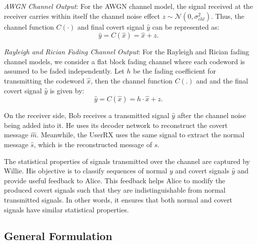 \textit{AWGN Channel Output}: For the AWGN channel model, the signal received at the receiver carries within itself the channel noise effect \(z \sim \mathcal{N}(0, \sigma_{chl}^2)\). Thus, the channel function \(C(\cdot)\) and final covert signal \(\hat{y}\) can be represented as:
\begin{equation}
	\hat{y} = C(\hat{x}) = \hat{x} + z.
\end{equation}


\textit{Rayleigh and Rician Fading Channel Output}: For the Rayleigh and Rician fading channel models, we consider a flat block fading channel where each codeword is assumed to be faded independently. Let \(h\) be the fading coefficient for transmitting the codeword \(\hat{x}\), then the channel function \(C(.)\) and and the final covert signal \(\hat{y}\) is given by:
\begin{equation}
	\hat{y} = C(\hat{x}) = h \cdot \hat{x} + z.
\end{equation}


On the receiver side, Bob receives a transmitted signal \(\hat{y}\) after the channel noise being added into it. He uses its decoder network to reconstruct the covert message \(\hat{m}\). Meanwhile, the UserRX uses the same signal to extract the normal message \(\hat{s}\), which is the reconstructed message of \(s\).


The statistical properties of signals transmitted over the channel are captured by Willie. His objective is to classify sequences of normal \(y\) and covert signals \(\hat{y}\) and provide useful feedback to Alice. This feedback helps Alice to modify the produced covert signals such that they are indistinguishable from normal transmitted signals. In other words, it ensures that both normal and covert signals have similar statistical properties.


\subsection{General Formulation}

